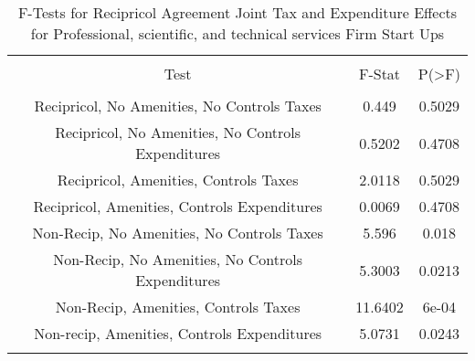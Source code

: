 
\begin{table}[!htbp] \centering 
  \caption{F-Tests for Recipricol Agreement Joint Tax and Expenditure Effects for Professional, scientific, and technical services Firm Start Ups} 
  \label{54Ftests} 
\begin{tabular}{@{\extracolsep{5pt}} ccc} 
\\[-1.8ex]\hline 
\hline \\[-1.8ex] 
Test & F-Stat & P(\textgreater F) \\ 
\hline \\[-1.8ex] 
Recipricol, No Amenities, No Controls Taxes & 0.449 & 0.5029 \\ 
Recipricol, No Amenities, No Controls Expenditures & 0.5202 & 0.4708 \\ 
Recipricol, Amenities, Controls Taxes & 2.0118 & 0.5029 \\ 
Recipricol, Amenities, Controls Expenditures & 0.0069 & 0.4708 \\ 
Non-Recip, No Amenities, No Controls Taxes & 5.596 & 0.018 \\ 
Non-Recip, No Amenities, No Controls Expenditures & 5.3003 & 0.0213 \\ 
Non-Recip, Amenities, Controls Taxes & 11.6402 & 6e-04 \\ 
Non-recip, Amenities, Controls Expenditures & 5.0731 & 0.0243 \\ 
\hline \\[-1.8ex] 
\end{tabular} 
\end{table} 
